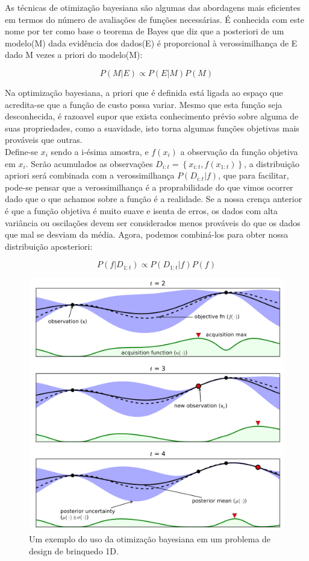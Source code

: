 \documentclass[
	12pt,				%
	openright,			%
	twoside,			%
	a4paper,			%
	english,			%
	french,				%
	spanish,			%
	brazil,				%
]{abntex2}
\begin{document}
As técnicas de otimização bayesiana são algumas das abordagens mais
eficientes em termos do número de avaliações de funções necessárias. É
conhecida com este nome por ter como base o teorema de Bayes que diz que
a posteriori de um modelo(M) dada evidência dos dados(E) é proporcional
à verossimilhança de E dado M vezes a priori do modelo(M):

\[
P(M|E) \propto P(E|M)P(M)
\]

Na optimização bayesiana, a priori que é definida está ligada ao espaço
que acredita-se que a função de custo possa variar. Mesmo que esta
função seja desconhecida, é razoavel supor que exista conhecimento
prévio sobre alguma de suas propriedades, como a suavidade, isto torna
algumas funções objetivas mais prováveis que outras.\\

Define-se \(x_i\) sendo a i-ésima amostra, e \(f(x_i)\) a observação da
função objetiva em \(x_i\). Serão acumulados as observações
\(D_{i:t}=\left\{ x_{i:t},f(x_{1:t}) \right\}\), a distribuição apriori
será combinada com a verossimilhança \(P(D_{i:t}|f)\), que para
facilitar, pode-se pensar que a verossimilhança é a proprabilidade do
que vimos ocorrer dado que o que achamos sobre a função é a realidade.
Se a nossa crença anterior é que a função objetiva é muito suave e
isenta de erros, os dados com alta variância ou oscilações devem ser
considerados menos prováveis do que os dados que mal se desviam da
média. Agora, podemos combiná-los para obter nossa distribuição
aposteriori:

\[
P(f|D_{1:t}) \propto P(D_{1:t}|f)P(f)
\]

\begin{figure}
\centering
\includegraphics[width=\textwidth,height=0.5\textheight]{images/bo.png}
\caption{Um exemplo do uso da otimização bayesiana em um problema de
design de brinquedo 1D.\label{bo}}
\end{figure}
\end{document}
